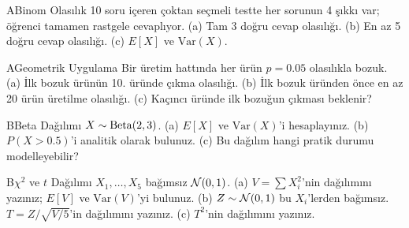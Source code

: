 

\begin{alistirma}[Al.5.5]{A}{Binom Olasılık}
10 soru içeren çoktan seçmeli testte her sorunun 4 şıkkı var; öğrenci tamamen rastgele cevaplıyor.
(a) Tam 3 doğru cevap olasılığı. (b) En az 5 doğru cevap olasılığı.
(c) $E[X]$ ve $\mathrm{Var}(X)$.
\end{alistirma}
\begin{alistirma}[Al.5.6]{A}{Geometrik Uygulama}
Bir üretim hattında her ürün $p = 0.05$ olasılıkla bozuk.
(a) İlk bozuk ürünün 10. üründe çıkma olasılığı.
(b) İlk bozuk üründen önce en az 20 ürün üretilme olasılığı.
(c) Kaçıncı üründe ilk bozuğun çıkması beklenir?
\end{alistirma}
\alistirmalar



\begin{alistirma}[Al.5.7]{B}{Beta Dağılımı}
$X \sim \operatorname{Beta}(2, 3)$.
(a) $E[X]$ ve $\mathrm{Var}(X)$'i hesaplayınız.
(b) $P(X > 0.5)$'i analitik olarak bulunuz.
(c) Bu dağılım hangi pratik durumu modelleyebilir?
\end{alistirma}

\begin{alistirma}[Al.5.8]{B}{$\chi^2$ ve $t$ Dağılımı}
$X_1, \ldots, X_5$ bağımsız $\mathcal{N}(0,1)$.
(a) $V = \sum X_i^2$'nin dağılımını yazınız; $E[V]$ ve $\mathrm{Var}(V)$'yi bulunuz.
(b) $Z \sim \mathcal{N}(0,1)$ bu $X_i$'lerden bağımsız. $T = Z/\sqrt{V/5}$'in dağılımını yazınız.
(c) $T^2$'nin dağılımını yazınız.
\end{alistirma}


